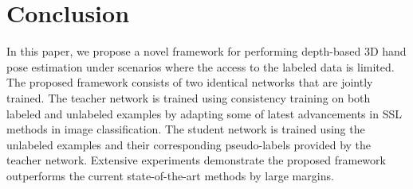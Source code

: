 \documentclass{article}
\begin{document}
\section{Conclusion}
In this paper, we propose a novel framework for performing depth-based 3D hand pose estimation under scenarios where the access to the labeled data is limited. The proposed framework consists of two identical networks that are jointly trained. The teacher network is trained using consistency training on both labeled and unlabeled examples by adapting some of latest advancements in SSL methods in image classification. The student network is trained using the unlabeled examples and their corresponding pseudo-labels provided by the teacher network. Extensive experiments demonstrate the proposed framework outperforms the current state-of-the-art methods by large margins.



  
  
\end{document}
